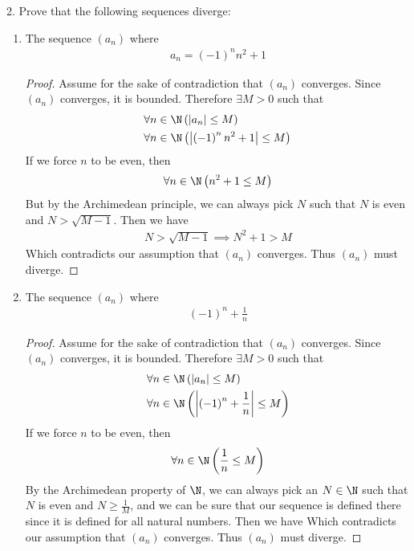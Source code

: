 2. Prove that the following sequences diverge:
\begin{enumerate}
	\item The sequence $\left( a_n \right) $ where 
		\begin{align}
			a_n = \left( -1 \right)^{n} n^{2} + 1
		\end{align}

		


	\begin{proof}
			Assume for the sake of contradiction that $\left( a_n \right) $ converges. Since $\left( a_n \right) $ converges, it is bounded. Therefore $\exists M > 0$ such that 
			\begin{align}
				&\forall n \in \N\left( \left|a_n\right| \le M \right) \\	
				&\forall n \in \N \left( \left|\left( -1 \right)^{n} n^{2} + 1 \right| \le M\right) 
			\end{align}
			If we force $n$ to be even, then
			\begin{align}
				\forall n \in \N \left( n^{2} + 1 \le M \right) 
			\end{align}
			But by the Archimedean principle, we can always pick $N$ such that $N$ is even and $N > \sqrt{M - 1} $. Then we have
			\begin{align}
				N > \sqrt{M - 1} \implies N^{2} + 1 > M 	
			\end{align}
			Which contradicts our assumption that $\left( a_n \right) $ converges. Thus $\left( a_n \right) $ must diverge.

	\end{proof}






	\item The sequence $\left( a_n \right)$ where
		\begin{align}
			\left( -1 \right)^{n} + \frac{1}{n}
		\end{align}



	\begin{proof}
			Assume for the sake of contradiction that $\left( a_n \right) $ converges. Since $\left( a_n \right) $ converges, it is bounded. Therefore $\exists M > 0$ such that 
			\begin{align}
				&\forall n \in \N\left( \left|a_n\right| \le M \right) \\	
				&\forall n \in \N \left( \left|\left( -1 \right)^{n} + \frac{1}{n} \right| \le M\right) 
			\end{align}
			If we force $n$ to be even, then
			\begin{align}
				\forall n \in \N \left( \frac{1}{n} \le M \right) 
			\end{align}
			By the Archimedean property of $\N$, we can always pick an $N \in \N$ such that $N$ is even and $N \ge \frac{1}{M}$, and we can be sure that our sequence is defined there since it is defined for all natural numbers. Then we have
			Which contradicts our assumption that $\left( a_n \right) $ converges. Thus $\left( a_n \right) $ must diverge.


\end{proof}
\end{enumerate}
